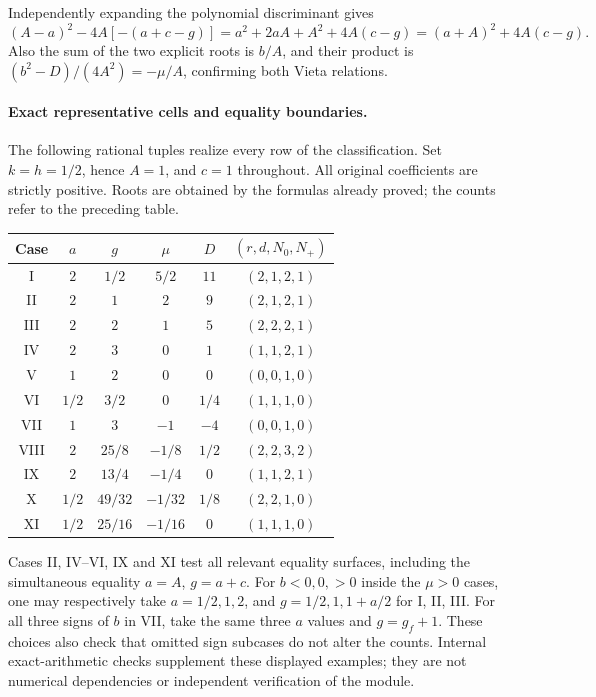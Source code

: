 Independently expanding the polynomial discriminant gives
\[
 (A-a)^2-4A[-(a+c-g)]
 =a^2+2aA+A^2+4A(c-g)
 =(a+A)^2+4A(c-g).
\]
Also the sum of the two explicit roots is $b/A$, and their product
is $(b^2-D)/(4A^2)=-\mu/A$, confirming both Vieta relations.

\paragraph{Exact representative cells and equality boundaries.}
The following rational tuples realize every row of the classification.
Set $k=h=1/2$, hence $A=1$, and $c=1$ throughout.
All original coefficients are strictly positive. Roots are obtained
by the formulas already proved; the counts refer to the preceding table.
\begin{center}
\small
\renewcommand{\arraystretch}{1.12}
\begin{tabular}{@{}c c c c c c@{}}
\toprule
Case & $a$ & $g$ & $\mu$ & $D$ & $(r,d,N_0,N_+)$\\
\midrule
I & $2$ & $1/2$ & $5/2$ & $11$ & $(2,1,2,1)$\\
II & $2$ & $1$ & $2$ & $9$ & $(2,1,2,1)$\\
III & $2$ & $2$ & $1$ & $5$ & $(2,2,2,1)$\\
IV & $2$ & $3$ & $0$ & $1$ & $(1,1,2,1)$\\
V & $1$ & $2$ & $0$ & $0$ & $(0,0,1,0)$\\
VI & $1/2$ & $3/2$ & $0$ & $1/4$ & $(1,1,1,0)$\\
VII & $1$ & $3$ & $-1$ & $-4$ & $(0,0,1,0)$\\
VIII & $2$ & $25/8$ & $-1/8$ & $1/2$ & $(2,2,3,2)$\\
IX & $2$ & $13/4$ & $-1/4$ & $0$ & $(1,1,2,1)$\\
X & $1/2$ & $49/32$ & $-1/32$ & $1/8$ & $(2,2,1,0)$\\
XI & $1/2$ & $25/16$ & $-1/16$ & $0$ & $(1,1,1,0)$\\
\bottomrule
\end{tabular}
\end{center}
Cases II, IV--VI, IX and XI test all relevant equality surfaces,
including the simultaneous equality $a=A$, $g=a+c$.
For $b<0,0,>0$ inside the $\mu>0$ cases, one may respectively
take $a=1/2,1,2$, and $g=1/2,1,1+a/2$ for I, II, III.
For all three signs of $b$ in VII, take the same three $a$ values
and $g=g_f+1$. These choices also check that omitted sign subcases
do not alter the counts. Internal exact-arithmetic checks supplement
these displayed examples; they are not numerical dependencies or
independent verification of the module.

